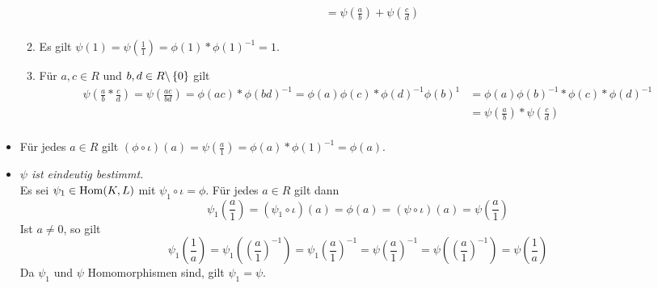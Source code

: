 \begin{exercisePage}
\begin{solution}
\begin{itemize}[leftmargin=*]
\begin{enumerate}[label=(\alph*)]
\begin{equation*}
\begin{aligned}
                        &= \psi \left( \frac{a}{b} \right) + \psi \left( \frac{c}{d} \right) \\
                    \end{aligned}
                \end{equation*}
                \item Es gilt $\psi(1) = \psi \left( \frac{1}{1} \right) = \phi(1) * \phi(1)^{-1} = 1$.
                \item Für $a,c \in R$ und $b,d \in R \backslash \left\{ 0 \right\}$ gilt
                \begin{equation*}
                \begin{aligned}
                \psi \left( \frac{a}{b} * \frac{c}{d} \right) 
                = \psi \left( \frac{ac}{bd} \right) 
                = \phi(ac) * \phi(bd)^{-1}
                = \phi(a)\phi(c) * \phi(d)^{-1} \phi(b)^{1} 
                &= \phi(a)\phi(b)^{-1} * \phi(c) * \phi(d)^{-1} \\
                &= \psi \left( \frac{a}{b} \right) * \psi \left( \frac{c}{d} \right) \\
                \end{aligned}
                \end{equation*}
            \end{enumerate}
        \item Für jedes $a \in R$ gilt $( \phi \circ \iota)(a) = \psi(\frac{a}{1}) = \phi(a) * \phi(1)^{-1} = \phi(a)$.
        \item \textit{$\psi$ ist eindeutig bestimmt.} \\
        Es sei $\psi_1 \in \operatorname{Hom}(K,L)$ mit $\psi_1 \circ \iota = \phi$. Für jedes $a \in R$ gilt dann
        \begin{equation*}
            \psi_1 \left( \frac{a}{1} \right) = \left( \psi_1 \circ \iota \right) (a) = \phi(a) = \left( \psi \circ \iota \right) (a) = \psi \left( \frac{a}{1} \right)
        \end{equation*} 
        Ist $a \neq 0$, so gilt
        \begin{equation*}
            \psi_1 \left( \frac{1}{a} \right) = \psi_1 \left( \left( \frac{a}{1} \right) ^{-1} \right) = \psi_1 \left(\frac{a}{1} \right)^{-1} = \psi \left( \frac{a}{1} \right)^{-1} = \psi \left( \left( \frac{a}{1} \right) ^{-1} \right) = \psi \left( \frac{1}{a} \right)
        \end{equation*} 
        Da $\psi_1$ und $\psi$ Homomorphismen sind, gilt $\psi_1 = \psi$.
        \end{itemize}
	\end{solution}


\end{exercisePage}
